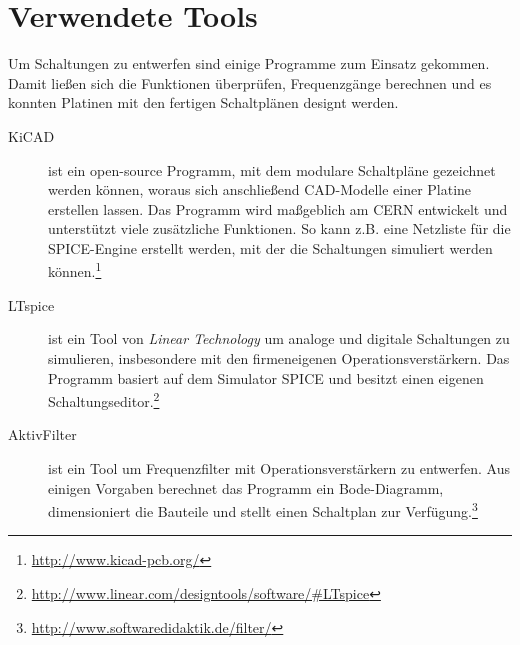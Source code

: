 \section{Verwendete Tools} %
Um Schaltungen zu entwerfen sind einige Programme zum Einsatz gekommen. Damit ließen sich die Funktionen überprüfen, Frequenzgänge berechnen und es konnten Platinen mit den fertigen Schaltplänen designt werden.
\begin{description}
	\item[KiCAD] ist ein open-source Programm, mit dem modulare Schaltpläne gezeichnet werden können, woraus sich anschließend CAD-Modelle einer Platine erstellen lassen. Das Programm wird maßgeblich am CERN entwickelt und unterstützt viele zusätzliche Funktionen. So kann z.B. eine Netzliste für die \ac{SPICE}-Engine erstellt werden, mit der die Schaltungen simuliert werden können.\footnote{\url{http://www.kicad-pcb.org/}}
	\item[LTspice] ist ein Tool von \textit{Linear Technology} um analoge und digitale Schaltungen zu simulieren, insbesondere mit den firmeneigenen Operationsverstärkern. Das Programm basiert auf dem Simulator \ac{SPICE} und besitzt einen eigenen Schaltungseditor.\footnote{\url{http://www.linear.com/designtools/software/\#LTspice}}
	\item[AktivFilter] ist ein Tool um Frequenzfilter mit Operationsverstärkern zu entwerfen. Aus einigen Vorgaben berechnet das Programm ein Bode-Diagramm, dimensioniert die Bauteile und stellt einen Schaltplan zur Verfügung.\footnote{\url{http://www.softwaredidaktik.de/filter/}}
\end{description}


